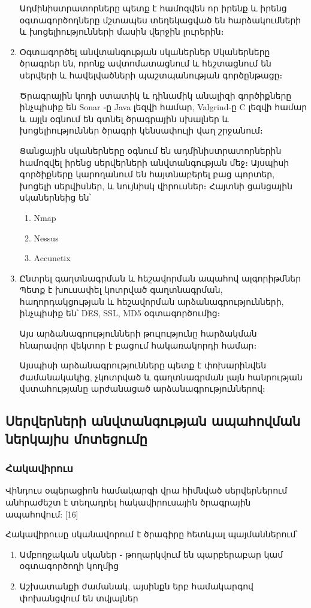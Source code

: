 \documentclass[11pt]{article}
\begin{document}
\begin{sloppypar}
\begin{enumerate}
    Ադմինիստրատորները պետք է համոզվեն որ իրենք և իրենց օգտագործողները
    մշտապես տեղեկացված են հարձակումների և խոցելիությունների մասին
    վերջին լուրերին։
\item Օգտագործել անվտանգության սկաներներ
    Սկաներները ծրագրեր են, որոնք ավտոմատացնում և հեշտացնում են սերվերի
    և հավելվածների պաշտպանության գործընթացը։

    Ծրագրային կոդի ստատիկ և դինամիկ անալիզի գործիքները ինչպիսիք են
    Sonar ֊ը Java լեզվի համար, Valgrind-ը C լեզվի համար և այլն
    օգնում են գտնել ծրագրային սխալներ և խոցելիություններ ծրագրի
    կենսափուլի վաղ շրջանում։

    Ցանցային սկաներները օգնում են ադմինիստրատորներին համոզվել իրենց
    սերվերների անվտանգության մեջ։ Այսպիսի գործիքները կարողանում են
    հայտնաբերել բաց պորտեր, խոցելի սերվիսներ, և նույնիսկ վիրուսներ։
    Հայտնի ցանցային սկաներնեից են՝
    \begin{enumerate}
        \item Nmap
        \item Nessus
        \item Accunetix
    \end{enumerate}
\item Ընտրել գաղտնագրման և հեշավորման ապահով ալգորիթմներ
    Պետք է խուսափել կոտրված գաղտնագրման, հաղորդակցության և
    հեշավորման արձանագրությունների, ինչպիսիք են՝ DES, SSL, MD5
    օգտագործումից։

    Այս արձանագրությունների թուլությունը հարձակման հնարավոր
    վեկտոր է բացում հակառակորդի համար։

    Այսպիսի արձանագրությունները պետք է փոխարինվեն ժամանակակից,
    չկոտրված և գաղտնագրման լայն հանրության վստահությանը արժանացած
    արձանագրություններով։
\end{enumerate}


\subsection{Սերվերների անվտանգության ապահովման ներկայիս մոտեցումը}


\subsubsection{Հակավիրուս}

Վինդուս օպերացիոն համակարգի վրա հիմնված սերվերներում անհրաժեշտ է տեղադրել
հակավիրուսային ծրագրային ապահովում: [16]

Հակավիրուսը սկանավորում է ծրագիրը հետևյալ պայմաններում՝
\begin{enumerate}
    \item Ամբողջական սկաներ ֊ թողարկվում են պարբերաբար կամ օգտագործողի կողմից
    \item Աշխատանքի ժամանակ, այսինքն երբ համակարգով փոխանցվում են տվյալներ
\end{enumerate}


\end{sloppypar}
\end{document}
